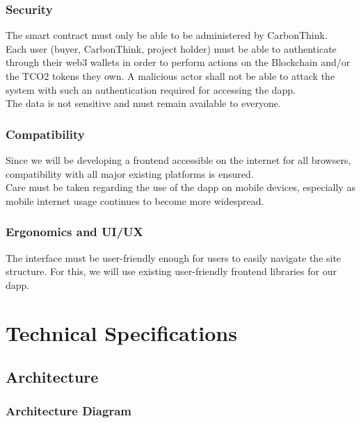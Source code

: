 \documentclass[a4paper, 12pt]{article}
\begin{document}
\subsubsection{Security}

The smart contract must only be able to be administered by CarbonThink.\\

Each user (buyer, CarbonThink, project holder) must be able to authenticate through their web3 wallets in order to perform actions on the Blockchain and/or the TCO2 tokens they own. A malicious actor shall not be able to attack the system with such an authentication required for accessing the dapp.\\

The data is not sensitive and must remain available to everyone.

\subsubsection{Compatibility}

Since we will be developing a frontend accessible on the internet for all browsers, compatibility with all major existing platforms is ensured.\\

Care must be taken regarding the use of the dapp on mobile devices, especially as mobile internet usage continues to become more widespread.

\subsubsection{Ergonomics and UI/UX}

The interface must be user-friendly enough for users to easily navigate the site structure. For this, we will use existing user-friendly frontend libraries for our dapp.

\section{Technical Specifications}

\subsection{Architecture}
\subsubsection{Architecture Diagram}
\end{document}
